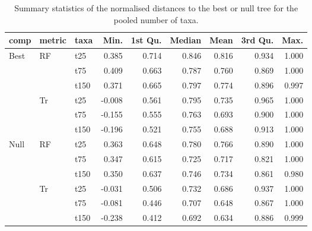 \begin{table}[ht]
\centering
\begin{tabular}{lllrrrrrr}
  \hline
comp & metric & taxa & Min. & 1st Qu. & Median & Mean & 3rd Qu. & Max. \\ 
  \hline
Best & RF & t25 & 0.385 & 0.714 & 0.846 & 0.816 & 0.934 & 1.000 \\ 
   &  & t75 & 0.409 & 0.663 & 0.787 & 0.760 & 0.869 & 1.000 \\ 
   &  & t150 & 0.371 & 0.665 & 0.797 & 0.774 & 0.896 & 0.997 \\ 
   & Tr & t25 & -0.008 & 0.561 & 0.795 & 0.735 & 0.965 & 1.000 \\ 
   &  & t75 & -0.155 & 0.555 & 0.763 & 0.693 & 0.900 & 1.000 \\ 
   &  & t150 & -0.196 & 0.521 & 0.755 & 0.688 & 0.913 & 1.000 \\ 
  Null & RF & t25 & 0.363 & 0.648 & 0.780 & 0.766 & 0.890 & 1.000 \\ 
   &  & t75 & 0.347 & 0.615 & 0.725 & 0.717 & 0.821 & 1.000 \\ 
   &  & t150 & 0.350 & 0.637 & 0.746 & 0.734 & 0.861 & 0.980 \\ 
   & Tr & t25 & -0.031 & 0.506 & 0.732 & 0.686 & 0.937 & 1.000 \\ 
   &  & t75 & -0.081 & 0.446 & 0.707 & 0.648 & 0.867 & 1.000 \\ 
   &  & t150 & -0.238 & 0.412 & 0.692 & 0.634 & 0.886 & 0.999 \\ 
   \hline
\end{tabular}
\caption{Summary statistics of the normalised distances to the best or null tree for the pooled number of taxa.} 
\label{Full_Tab_pooledtaxa}
\end{table}
